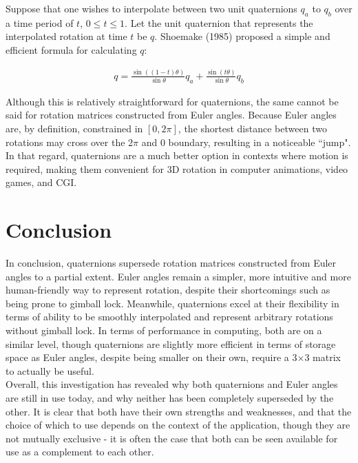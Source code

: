 \documentclass[12pt, a4paper]{article}
\begin{document}
Suppose that one wishes to interpolate between two unit quaternions $q_a$ to
$q_b$ over a time period of $t$, $0 \leq t \leq 1$. Let the unit quaternion that
represents the interpolated rotation at time $t$ be $q$. Shoemake (1985)
proposed a simple and efficient formula for calculating $q$:

\begin{align*}
    q = \frac{\sin((1 - t)\theta)}{\sin\theta}q_a + \frac{\sin(t\theta)}{\sin\theta}q_b
\end{align*}

Although this is relatively straightforward for quaternions, the same cannot be
said for rotation matrices constructed from Euler angles. Because Euler angles
are, by definition, constrained in $[0, 2\pi]$, the shortest distance between
two rotations may cross over the $2\pi$ and $0$ boundary, resulting in a
noticeable ``jump". \\

In that regard, quaternions are a much better option in contexts where motion is
required, making them convenient for 3D rotation in computer animations, video
games, and CGI. \\


\section{Conclusion}
In conclusion, quaternions supersede rotation matrices constructed from Euler
angles to a partial extent. Euler angles remain a simpler, more intuitive and
more human-friendly way to represent rotation, despite their shortcomings such
as being prone to gimball lock. Meanwhile, quaternions excel at their
flexibility in terms of ability to be smoothly interpolated and represent
arbitrary rotations without gimball lock. In terms of performance in computing,
both are on a similar level, though quaternions are slightly more efficient in
terms of storage space as Euler angles, despite being smaller on their own,
require a 3$\times$3 matrix to actually be useful. \\

Overall, this investigation has revealed why both quaternions and Euler angles
are still in use today, and why neither has been completely superseded by the
other. It is clear that both have their own strengths and weaknesses, and that
the choice of which to use depends on the context of the application, though
they are not mutually exclusive - it is often the case that both can be seen
available for use as a complement to each other. \\
\end{document}
